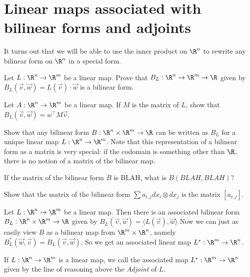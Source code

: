 
\section{Linear maps associated with bilinear forms and adjoints}
	
	It turns out that we will be able to use the inner product on $\R^n$ to rewrite any bilinear form on $\R^n$ in a special form. 
	
	\begin{question}
		Let $L: \R^n \to \R^m$ be a linear map.  Prove that $B_L:\R^n \to \R^m \to \R$ given by $B_L(\vec{v},\vec{w}) = L(\vec{v}) \cdot \vec{w}$ is a bilinear form.
	\end{question}	
	
	\begin{question}
		Let $A: \R^n \to \R^m $ be a linear map.  If $M$ is the matrix of $L$, show that $B_L(\vec{v},\vec{w}) = w^\top M \vec{v}$.
	\end{question}
	
	\begin{question}
		Show that any bilinear form $B: \R^n \times \R^m \to \R$ can be written as $B_L$ for a unique linear map $L: \R^n \to \R^m$.  Note that this representation of a 
		bilinear form as a matrix is very special:  if the codomain is something other than $\R$, there is no notion of a matrix of the bilinear map.
	\end{question}
	
	\begin{question}
		If the matrix of the bilinear form $B$ is BLAH, what is $B(BLAH,BLAH)$?
	\end{question}
	
	\begin{question}
		Show that the matrix of the bilinear form $\sum a_{i,j} dx_i \otimes dx_j$ is the matrix $[a_{i,j}]$.
	\end{question}
	
	
	Let $L: \R^n \to \R^m$ be a linear map.  
		Then there is an associated bilinear form $B_L  : \R^n \times \R^m \to \R$ given by $B_L(\vec{v},\vec{w}) = \langle L(\vec{v}), \vec{w} \rangle$
		Now we can just as easily view $B$ as a bilinear map from $\R^m \times \R^n$, namely $B_L^* (\vec{w},\vec{v}) = B_L(\vec{v},\vec{w})$.
		So we get an associated linear map $L^* : \R^m \to \R^n$.
		
		\begin{definition}
			If $L:\R^n \to \R^m$ is a linear map, we call the associated map $L^* : \R^m \to \R^n$ given by the line of reasoning above the \textit{Adjoint} of $L$.
		\end{definition}
		
